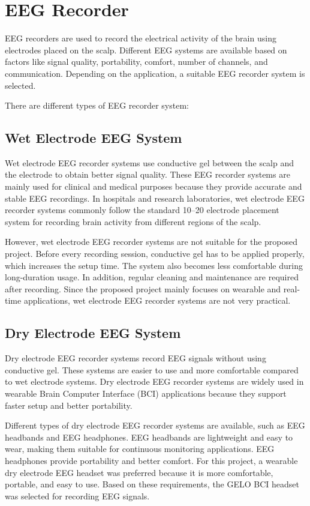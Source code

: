 \section{EEG Recorder}
EEG recorders are used to record the electrical activity of the brain using electrodes
placed on the scalp. Different EEG systems are available based on factors like signal
quality, portability, comfort, number of channels, and communication. Depending on the
application, a suitable EEG recorder system is selected.

There are different types of EEG recorder system:

\subsection{Wet Electrode EEG System}

Wet electrode EEG recorder systems use conductive gel between the scalp and the electrode
to obtain better signal quality. These EEG recorder systems are mainly used for clinical
and medical purposes because they provide accurate and stable EEG recordings. In hospitals
and research laboratories, wet electrode EEG recorder systems commonly follow the standard
10--20 electrode placement system \cite{jasper1958tentwenty} for recording brain activity
from different regions of the scalp.

However, wet electrode EEG recorder systems are not suitable for the proposed project.
Before every recording session, conductive gel has to be applied properly, which increases
the setup time. The system also becomes less comfortable during long-duration usage. In
addition, regular cleaning and maintenance are required after recording. Since the proposed
project mainly focuses on wearable and real-time applications, wet electrode EEG recorder
systems are not very practical.

\subsection{Dry Electrode EEG System}

Dry electrode EEG recorder systems record EEG signals without using conductive gel. These
systems are easier to use and more comfortable compared to wet electrode systems. Dry
electrode EEG recorder systems are widely used in wearable Brain Computer Interface (BCI)
applications because they support faster setup and better portability.

Different types of dry electrode EEG recorder systems are available, such as EEG headbands
and EEG headphones. EEG headbands are lightweight and easy to wear, making them suitable
for continuous monitoring applications. EEG headphones provide portability and better
comfort. For this project, a wearable dry electrode EEG headset was preferred because it is
more comfortable, portable, and easy to use. Based on these requirements, the GELO BCI
headset was selected for recording EEG signals.

